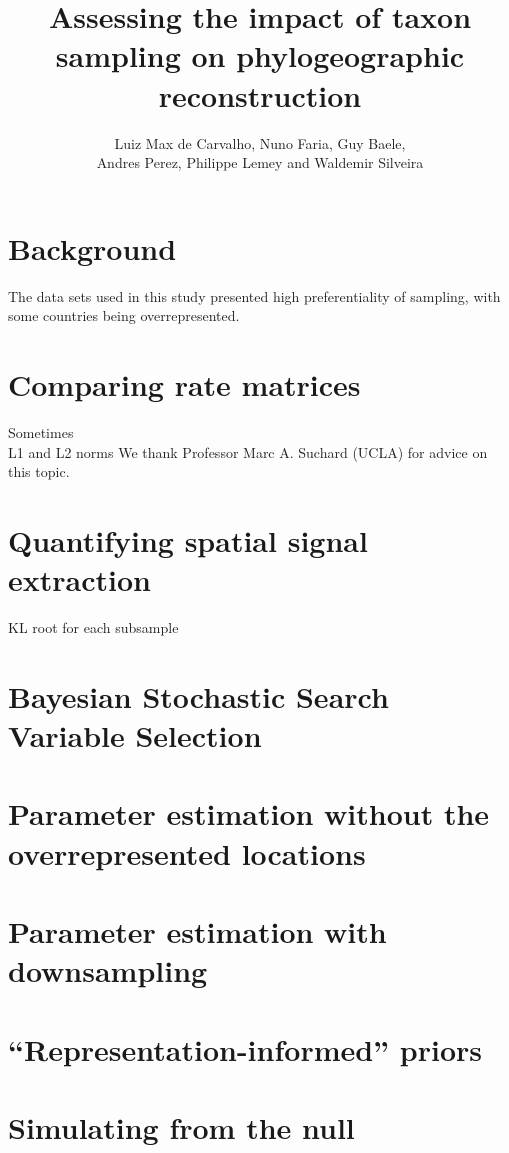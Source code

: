 \documentclass[a4paper,10pt]{article}
\title{Assessing the impact of taxon sampling on phylogeographic reconstruction} %
\author{
Luiz Max de Carvalho, Nuno Faria, Guy Baele,\\ 
Andres Perez, Philippe Lemey and Waldemir Silveira 
}
\begin{document}
\maketitle

\section{Background}
The data sets used in this study presented high preferentiality of sampling, with some countries being overrepresented.
\section{Comparing rate matrices}
Sometimes \\
L1 and L2 norms
We thank Professor Marc A. Suchard (UCLA) for advice on this topic.\\
\section{Quantifying spatial signal extraction}
KL root for each subsample
\section{Bayesian Stochastic Search Variable Selection}
\section{Parameter estimation without the overrepresented locations}
\section{Parameter estimation with downsampling}
\section{``Representation-informed'' priors}
\section{Simulating from the null}
\newpage

\end{document}
